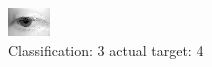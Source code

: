 \begin{figure}[h!]
\begin{center}
\includegraphics[width=0.60\columnwidth]{figures/ID2554_class_3_target_4.png}
\end{center}
\caption{ Classification: 3 actual target: 4}
\label{fig:ID2554_class_3_target_4}
\end{figure}
